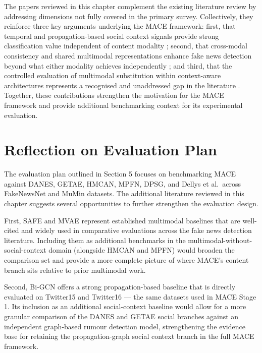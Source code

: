 The papers reviewed in this chapter complement the existing literature review by addressing dimensions not fully covered in the primary survey. Collectively, they reinforce three key arguments underlying the MACE framework: first, that temporal and propagation-based social context signals provide strong classification value independent of content modality \cite{Liu2020, Bian2020}; second, that cross-modal consistency and shared multimodal representations enhance fake news detection beyond what either modality achieves independently \cite{Zhou2020, Khattar2019}; and third, that the controlled evaluation of multimodal substitution within context-aware architectures represents a recognised and unaddressed gap in the literature \cite{Luo2021, Hu2022}. Together, these contributions strengthen the motivation for the MACE framework and provide additional benchmarking context for its experimental evaluation.

\section{Reflection on Evaluation Plan}

The evaluation plan outlined in Section 5 focuses on benchmarking MACE against DANES, GETAE, HMCAN, MPFN, DPSG, and Dellys et al.\ across FakeNewsNet and MuMin datasets. The additional literature reviewed in this chapter suggests several opportunities to further strengthen the evaluation design.

First, SAFE \cite{Zhou2020} and MVAE \cite{Khattar2019} represent established multimodal baselines that are well-cited and widely used in comparative evaluations across the fake news detection literature. Including them as additional benchmarks in the multimodal-without-social-context domain (alongside HMCAN and MPFN) would broaden the comparison set and provide a more complete picture of where MACE's content branch sits relative to prior multimodal work.

Second, Bi-GCN \cite{Bian2020} offers a strong propagation-based baseline that is directly evaluated on Twitter15 and Twitter16 — the same datasets used in MACE Stage 1. Its inclusion as an additional social-context baseline would allow for a more granular comparison of the DANES and GETAE social branches against an independent graph-based rumour detection model, strengthening the evidence base for retaining the propagation-graph social context branch in the full MACE framework.

